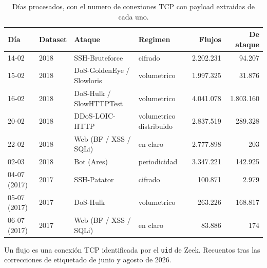 \begin{table}[htbp]
  \centering
  \caption{Días procesados, con el numero de conexiones TCP con payload extraidas de cada uno.}
  \label{tab:días}
  \footnotesize
  \begin{tabular}{llllrr}
    \toprule
    \textbf{Día} & \textbf{Dataset} & \textbf{Ataque} & \textbf{Regimen} & \textbf{Flujos} & \textbf{De ataque} \\
    \midrule
    14-02 & 2018 & SSH-Bruteforce & cifrado & 2.202.231 & 94.207 \\
    15-02 & 2018 & DoS-GoldenEye / Slowloris & volumetrico & 1.997.325 & 31.876 \\
    16-02 & 2018 & DoS-Hulk / SlowHTTPTest & volumetrico & 4.041.078 & 1.803.160 \\
    20-02 & 2018 & DDoS-LOIC-HTTP & volumetrico distribuido & 2.837.519 & 289.328 \\
    22-02 & 2018 & Web (BF / XSS / SQLi) & en claro & 2.777.898 & 203 \\
    02-03 & 2018 & Bot (Ares) & periodicidad & 3.347.221 & 142.925 \\
    04-07 (2017) & 2017 & SSH-Patator & cifrado & 100.871 & 2.979 \\
    05-07 (2017) & 2017 & DoS-Hulk & volumetrico & 263.226 & 168.817 \\
    06-07 (2017) & 2017 & Web (BF / XSS / SQLi) & en claro & 83.886 & 174 \\
    \bottomrule
  \end{tabular}
  \par\smallskip\footnotesize{Un flujo es una conexión TCP identificada por el \texttt{uid} de Zeek. Recuentos tras las correcciones de etiquetado de junio y agosto de 2026.}
\end{table}
